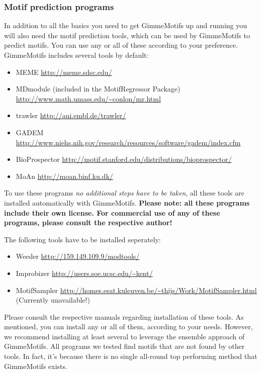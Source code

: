 \documentclass[10pt]{article}
\begin{document}
\subsubsection{Motif prediction programs}
In addition to all the basics you need to get GimmeMotifs up and running you will also need the motif prediction tools, which can be used by GimmeMotifs to predict motifs. You can use any or all of these according to your preference. GimmeMotifs includes several tools by default:
\begin{itemize}
\item MEME \cite{bailey_meme_2009} \url{http://meme.sdsc.edu/}
\item MDmodule \cite{liu_algorithm_2002} (included in the MotifRegressor
Package) \url{http://www.math.umass.edu/~conlon/mr.html}
\item trawler \cite{ettwiller_trawler:_2007} \url{http://ani.embl.de/trawler/}
\item GADEM \cite{li_gadem:genetic_2009} \url{http://www.niehs.nih.gov/research/resources/software/gadem/index.cfm}
\item BioProspector \cite{liu_bioprospector:_2001} \url{http://motif.stanford.edu/distributions/bioprospector/}
\item MoAn \cite{valen_discovery_2009} \url{http://moan.binf.ku.dk/}
\end{itemize}
To use these programs \emph{no additional steps have to be taken}, all these tools are installed automatically with GimmeMotifs. \textbf{Please note: all these programs include their own license. For commercial use of any of these programs, please consult the respective author!}

The following tools have to be installed seperately: 
\begin{itemize}
\item Weeder \cite{pavesi_weeder_2004} \url{http://159.149.109.9/modtools/}
\item Improbizer \cite{ao_environmentally_2004} \url{http://users.soe.ucsc.edu/~kent/}
\item MotifSampler \cite{thijs_higher-order_2001} \url{http://homes.esat.kuleuven.be/~thijs/Work/MotifSampler.html} (Currently unavailable!)
\end{itemize}

Please consult the respective manuals regarding installation of these tools. As mentioned, you can install any or all of them, according to your needs. However, we recommend installing at least several to leverage the ensemble approach of GimmeMotifs. All programs we tested find motifs that are not found by other tools. In fact, it's because there is no single all-round top performing method that GimmeMotifs exists. 
\end{document}
